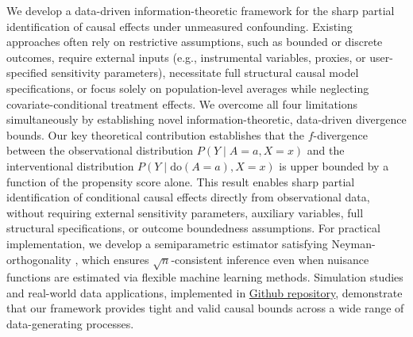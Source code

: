 We develop a data-driven information-theoretic framework for the sharp partial identification of causal effects under unmeasured confounding. Existing approaches often rely on restrictive assumptions, such as bounded or discrete outcomes, require external inputs (e.g., instrumental variables, proxies, or user-specified sensitivity parameters), necessitate full structural causal model specifications, or focus solely on population-level averages while neglecting covariate-conditional treatment effects. We overcome all four limitations simultaneously by establishing novel information-theoretic, data-driven divergence bounds. Our key theoretical contribution establishes that the $f$-divergence between the observational distribution $P(Y \mid A=a, X=x)$ and the interventional distribution $P(Y \mid \mathrm{do}(A=a), X=x)$ is upper bounded by a function of the propensity score alone. This result enables sharp partial identification of conditional causal effects directly from observational data, without requiring external sensitivity parameters, auxiliary variables, full structural specifications, or outcome boundedness assumptions. For practical implementation, we develop a semiparametric estimator satisfying Neyman-orthogonality \citep{chernozhukov2018double}, which ensures $\sqrt{n}$-consistent inference even when nuisance functions are estimated via flexible machine learning methods. Simulation studies and real-world data applications, implemented in \href{https://github.com/yonghanjung/Information-Theretic-Bounds}{Github repository}, demonstrate that our framework provides tight and valid causal bounds across a wide range of data-generating processes.
